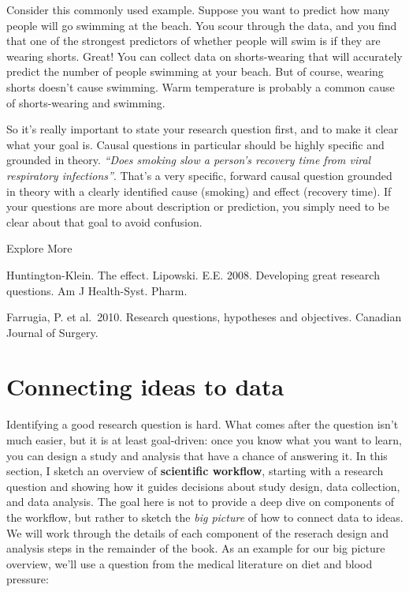 \documentclass[
]{book}
\begin{document}
Consider this commonly used example. Suppose you want to predict how many people will go swimming at the beach. You scour through the data, and you find that one of the strongest predictors of whether people will swim is if they are wearing shorts. Great! You can collect data on shorts-wearing that will accurately predict the number of people swimming at your beach. But of course, wearing shorts doesn't cause swimming. Warm temperature is probably a common cause of shorts-wearing and swimming.

So it's really important to state your research question first, and to make it clear what your goal is. Causal questions in particular should be highly specific and grounded in theory. \emph{``Does smoking slow a person's recovery time from viral respiratory infections''}. That's a very specific, forward causal question grounded in theory with a clearly identified cause (smoking) and effect (recovery time). If your questions are more about description or prediction, you simply need to be clear about that goal to avoid confusion.

Explore More

Huntington-Klein. The effect. Lipowski. E.E. 2008. Developing great research questions. Am J Health-Syst. Pharm.

Farrugia, P. et al.~2010. Research questions, hypotheses and objectives. Canadian Journal of Surgery.

\section{Connecting ideas to data}\label{connecting-ideas-to-data}

Identifying a good research question is hard. What comes after the question isn't much easier, but it is at least goal-driven: once you know what you want to learn, you can design a study and analysis that have a chance of answering it. In this section, I sketch an overview of \textbf{scientific workflow}, starting with a research question and showing how it guides decisions about study design, data collection, and data analysis. The goal here is not to provide a deep dive on components of the workflow, but rather to sketch the \emph{big picture} of how to connect data to ideas. We will work through the details of each component of the reserach design and analysis steps in the remainder of the book. As an example for our big picture overview, we'll use a question from the medical literature on diet and blood pressure:
\end{document}
